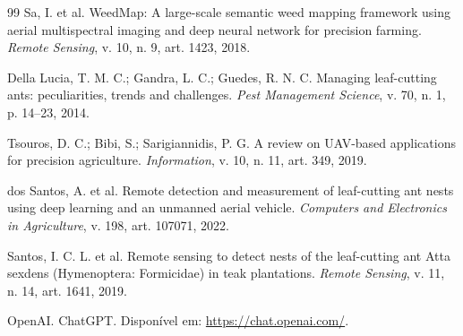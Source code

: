 \documentclass[10pt,a4paper,twocolumn]{article}
\begin{document}
\begin{thebibliography}{99}
Sa, I. et al.
WeedMap: A large-scale semantic weed mapping framework using aerial multispectral imaging and deep neural network for precision farming.
\textit{Remote Sensing}, v. 10, n. 9, art. 1423, 2018.

Della Lucia, T. M. C.; Gandra, L. C.; Guedes, R. N. C.
Managing leaf-cutting ants: peculiarities, trends and challenges.
\textit{Pest Management Science}, v. 70, n. 1, p. 14--23, 2014.

Tsouros, D. C.; Bibi, S.; Sarigiannidis, P. G.
A review on UAV-based applications for precision agriculture.
\textit{Information}, v. 10, n. 11, art. 349, 2019.

dos Santos, A. et al.
Remote detection and measurement of leaf-cutting ant nests using deep learning and an unmanned aerial vehicle.
\textit{Computers and Electronics in Agriculture}, v. 198, art. 107071, 2022.

Santos, I. C. L. et al.
Remote sensing to detect nests of the leaf-cutting ant Atta sexdens (Hymenoptera: Formicidae) in teak plantations.
\textit{Remote Sensing}, v. 11, n. 14, art. 1641, 2019.

OpenAI.
ChatGPT.
Disponível em: \url{https://chat.openai.com/}.

\end{thebibliography}
\end{document}
